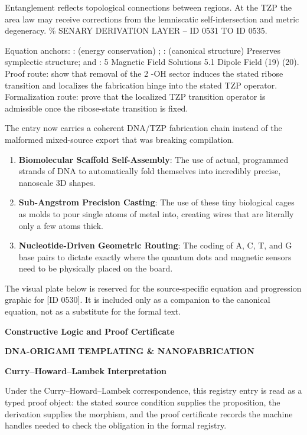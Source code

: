 Entanglement reflects topological connections between regions. At the TZP the area law may receive corrections from the lemniscatic self-intersection and metric degeneracy. \% SENARY DERIVATION LAYER -- ID 0531 TO ID 0535.

Equation anchors: : (energy conservation)  ; :   (canonical structure)   Preserves symplectic structure; and : 5 Magnetic Field Solutions 5.1 Dipole Field (19) (20). Proof route: show that removal of the 2 -OH sector induces the stated ribose transition and localizes the fabrication hinge into the stated TZP operator. Formalization route: prove that the localized TZP transition operator is admissible once the ribose-state transition is fixed.

The entry now carries a coherent DNA/TZP fabrication chain instead of the malformed mixed-source export that was breaking compilation.
\endgroup

\begin{enumerate}[leftmargin=1.6em,itemsep=6pt,topsep=4pt]
\item \textbf{Biomolecular Scaffold Self-Assembly}: The use of actual, programmed strands of DNA to automatically fold themselves into incredibly precise, nanoscale 3D shapes.
\item \textbf{Sub-Angstrom Precision Casting}: The use of these tiny biological cages as molds to pour single atoms of metal into, creating wires that are literally only a few atoms thick.
\item \textbf{Nucleotide-Driven Geometric Routing}: The coding of A, C, T, and G base pairs to dictate exactly where the quantum dots and magnetic sensors need to be physically placed on the board.
\end{enumerate}

\begingroup\footnotesize\sloppy
The visual plate below is reserved for the source-specific equation and progression graphic for [ID 0530]. It is included only as a companion to the canonical equation, not as a substitute for the formal text.
\par\endgroup
\ifTZPDarkEdition
{}
\fi

\clearpage
\begingroup\tzpsupportsetup
\noindent\textbf{\fontsize{10.8pt}{12.8pt}\selectfont [ID 0530] Constructive Logic and Proof Certificate}\par
\noindent\textbf{\fontsize{10pt}{12pt}\selectfont DNA-ORIGAMI TEMPLATING \& NANOFABRICATION}\par
\vspace{0.45em}
\begingroup
\footnotesize
\setlength{\parskip}{0.22em}
\setlength{\parindent}{0pt}
\noindent\textbf{Curry--Howard--Lambek Interpretation}\par
Under the Curry--Howard--Lambek correspondence, this registry entry is read as a typed proof
object: the stated source condition supplies the proposition, the derivation supplies the
morphism, and the proof certificate records the machine handles needed to check the obligation
in the formal registry.

